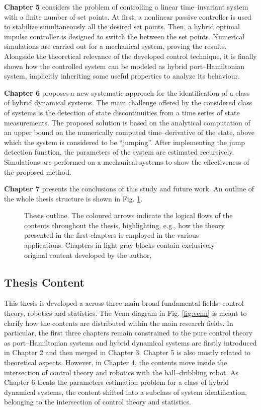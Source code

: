%
\textbf{Chapter 5} considers the problem of controlling a linear time--invariant system with a finite number of set points. At first, a nonlinear passive controller is used to stabilize simultaneously all the desired set points. Then, a hybrid optimal impulse controller is designed to switch the between the set points. Numerical simulations are carried out for a mechanical system, proving the results. Alongside the theoretical relevance of the developed control technique, it is finally shown how the controlled system can be modeled as hybrid port--Hamiltonian system, implicitly inheriting some useful properties to analyze its behaviour.
%
\newline

%
\textbf{Chapter 6} proposes a new systematic approach for the identification of a class of hybrid dynamical systems. The main challenge offered by the considered class of systems is the detection of state discontinuities from a time series of state measurements. The proposed solution is based on the analytical computation of an upper bound on the numerically computed time--derivative of the state, above which the system is considered to be ``jumping''. After implementing the jump detection function, the parameters of the system are estimated recursively. Simulations are performed on a mechanical systems to show the effectiveness of the proposed method.
\newline

%
\textbf{Chapter 7} presents the conclusions of this study and future work. An outline of the whole thesis structure is shown in Fig. \ref{fig:ThesisStructure}.
%
\begin{figure}[b]
    \centering
    
    \vspace{5mm}
    \caption{Thesis outline. The coloured arrows indicate the logical flows of the contents throughout the thesis, highlighting, e.g., how the theory presented in the first chapters is employed in the various applications. Chapters in light gray blocks contain exclusively original content developed by the author,}
    \label{fig:ThesisStructure}
\end{figure}
%
%
%
\subsection{Thesis Content}
This thesis is developed a across three main broad fundamental fields: control theory, robotics and statistics. The Venn diagram in Fig. \ref{fig:venn} is meant to clarify how the contents are distributed within the main research fields. In particular, the first three chapters  remain constrained to the pure control theory as port--Hamiltonian systems and hybrid dynamical systems are firstly introduced in Chapter 2 and then merged in Chapter 3. Chapter 5 is also mostly related to theoretical aspects. However, in Chapter 4, the contents move inside the intersection of control theory and robotics with the ball--dribbling robot. As Chapter 6 treats the parameters estimation problem for a class of hybrid dynamical systems, the content shifted into a subclass of system identification, belonging to the intersection of control theory and statistics.

